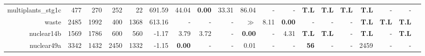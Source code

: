 \begin{table*}[t]
\begin{tabular}{|r|r|r|r|r||r||r|r|r|r|r|r||r|r|r|r|r|r|r|}
         multiplants\_stg1c &          477 &          270 &          252 &           22 &              691.59 &          44.04 &  \textbf{0.00} &          33.31 &          86.04 &              - &              - & \textbf{T.L} & \textbf{T.L} &       \textbf{T.L} &       \textbf{T.L} &           - &           - \\ 
                      waste &         2485 &         1992 &          400 &         1368 &              613.16 &              - &              - &              - &          $\gg$ &           8.11 &  \textbf{0.00} &            - &            - &                  - &       \textbf{T.L} &\textbf{T.L} &\textbf{T.L} \\ 
                 nuclear14b &         1569 &         1786 &          600 &          560 &               -1.17 &           3.79 &           3.72 &              - &  \textbf{0.00} &              - &           4.31 & \textbf{T.L} & \textbf{T.L} &                  - &       \textbf{T.L} &           - &\textbf{T.L} \\ 
                 nuclear49a &         3342 &         1432 &         2450 &         1332 &               -1.15 &  \textbf{0.00} &              - &              - &           0.01 &              - &              - &  \textbf{56} &            - &                  - &               2459 &           - &           - \\ 
\hline 
\end{tabular}\\ 
\label{table:results} 
\end{table*} 
